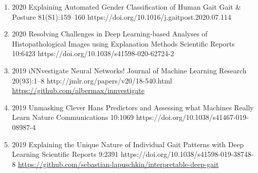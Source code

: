{\begin{enumerate}
    \item {}
                        {2020}
                        {Explaining Automated Gender Classification of Human Gait}
                        {Gait \& Posture}
                        {81(S1):159--160}
                        {https://doi.org/10.1016/j.gaitpost.2020.07.114}

    \item {}
                        {2020}
                        {Resolving Challenges in Deep Learning-based Analyses of Histopathological Images using Explanation Methods}
                        {Scientific Reports}
                        {10:6423}
                        {https://doi.org/10.1038/s41598-020-62724-2}

    \item {}
                        {2019}
                        {iNNvestigate Neural Networks!}
                        {Journal of Machine Learning Research}
                        {20(93):1--8}
                        {http://jmlr.org/papers/v20/18-540.html}
                        {\href{https://github.com/albermax/innvestigate}{https://github.com/albermax/innvestigate}}

    \item {}
                        {2019}
                        {Unmasking Clever Hans Predictors and Assessing what Machines Really Learn}
                        {Nature Communications}
                        {10:1069}
                        {https://doi.org/10.1038/s41467-019-08987-4}

    \item {}
                        {2019}
                        {Explaining the Unique Nature of Individual Gait Patterns with Deep Learning}
                        {Scientific Reports}
                        {9:2391}
                        {https://doi.org/10.1038/s41598-019-38748-8}
                        {\href{https://github.com/sebastian-lapuschkin/interpretable-deep-gait}{https://github.com/sebastian-lapuschkin/interpretable-deep-gait}}


\end{enumerate}}
